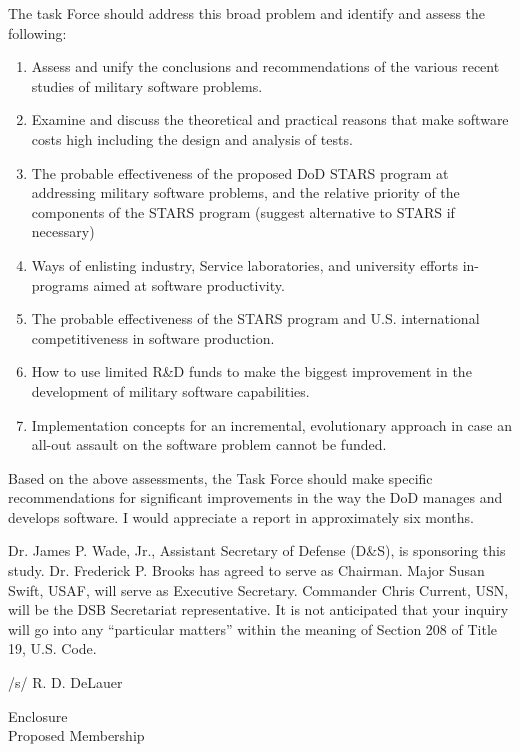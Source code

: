 \documentclass[12pt]{article}
\begin{document}
The task Force should address this broad problem and
identify and assess the following:

\renewcommand{\labelenumi}{\Alph{enumi}.}
\begin{enumerate}
    \item Assess and unify the conclusions and recommendations of the various
        recent studies of military software problems.
    \item Examine and discuss the theoretical and practical reasons that make
        software costs high including the design and analysis of tests.
    \item The probable effectiveness of the proposed DoD STARS program at
        addressing military software problems, and the relative priority of the
        components of the STARS program (suggest alternative to STARS if
        necessary)
    \item Ways of enlisting industry, Service laboratories, and university
        efforts in-programs aimed at software productivity.
    \item The probable effectiveness of the STARS program and U.S. international
        competitiveness in software production.
    \item How to use limited R\&D funds to make the biggest improvement in the
        development of military software capabilities.
    \item Implementation concepts for an incremental, evolutionary approach in
        case an all-out assault on the software problem cannot be funded.
\end{enumerate}

Based on the above assessments, the Task Force should make specific
recommendations for significant improvements in the way the DoD manages and
develops software.  I would appreciate a report in approximately six months.

Dr. James P. Wade, Jr., Assistant Secretary of Defense (D\&S), is sponsoring
this study. Dr. Frederick P. Brooks has agreed to serve as Chairman.  Major
Susan Swift, USAF, will serve as Executive Secretary.  Commander Chris Current,
USN, will be the DSB Secretariat representative.  It is not anticipated that
your inquiry will go into any “particular matters” within the meaning of
Section 208 of Title 19, U.S. Code.

\begin{center}
    /s/ R. D. DeLauer
\end{center}

\noindent Enclosure\\
\hspace*{1ex}Proposed Membership
\end{document}
